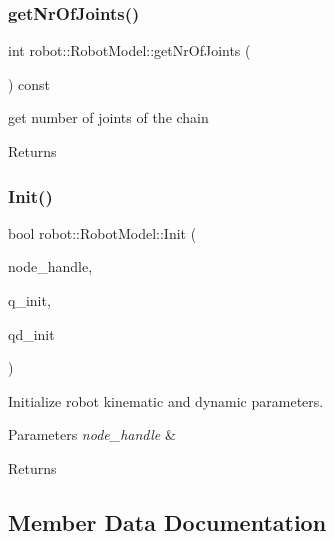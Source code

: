 \subsubsection{\texorpdfstring{get\+Nr\+Of\+Joints()}{getNrOfJoints()}}
{\footnotesize\ttfamily int robot\+::\+Robot\+Model\+::get\+Nr\+Of\+Joints (\begin{DoxyParamCaption}{ }\end{DoxyParamCaption}) const\hspace{0.3cm}{\ttfamily [inline]}}



get number of joints of the chain 

\begin{DoxyReturn}{Returns}

\end{DoxyReturn}
\mbox{\label{classrobot_1_1_robot_model_a0398088779cef8797c8a0a8d51123e4d}} 
\subsubsection{\texorpdfstring{Init()}{Init()}}
{\footnotesize\ttfamily bool robot\+::\+Robot\+Model\+::\+Init (\begin{DoxyParamCaption}\item[{ros\+::\+Node\+Handle \&}]{node\+\_\+handle,  }\item[{const Eigen\+::\+Vector\+Xd \&}]{q\+\_\+init,  }\item[{const Eigen\+::\+Vector\+Xd \&}]{qd\+\_\+init }\end{DoxyParamCaption})}



Initialize robot kinematic and dynamic parameters. 


\begin{DoxyParams}{Parameters}
{\em node\+\_\+handle} & \\
\hline
\end{DoxyParams}
\begin{DoxyReturn}{Returns}

\end{DoxyReturn}


\subsection{Member Data Documentation}
\mbox{\label{classrobot_1_1_robot_model_a6f76e9a06f0c7b947f169cc6ea511c99}} 
